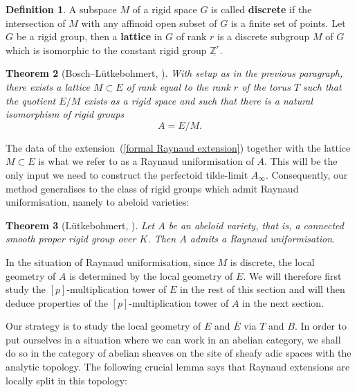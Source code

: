 \documentclass[10pt,oneside]{amsart}
\newtheorem{theorem}{Theorem}[section]
\theoremstyle{definition}
\newtheorem{definition}[theorem]{Definition}
\begin{document}
	\begin{definition}
		A subspace $M$ of a rigid space $G$ is called \textbf{discrete} if the intersection of $M$ with any affinoid open subset of $G$ is a finite set of points.
		Let $G$ be a rigid group, then a \textbf{lattice} in $G$ of rank $r$ is a discrete subgroup $M$ of $G$ which is isomorphic to the constant rigid group $\underline{\mathbb Z^r}$. 
	\end{definition}
	
	\begin{theorem}[Bosch--L\"utkebohmert, {\cite[Theorem~1.2]{BL}}]\label{Raynaud uniformisation}
	    With setup as in the previous paragraph, there exists a lattice $M \subset E$ of rank equal to the rank $r$ of the torus $T$ such that the quotient $E/M$ exists as a rigid space and such that there is a natural isomorphism of rigid groups
		\[A=E/M.\]
	\end{theorem}
	
	The data of the extension~(\ref{formal Raynaud extension}) together with the lattice $M\subset E$ is what we refer to as a Raynaud uniformisation of $A$. This will be the only input we need to construct the perfectoid tilde-limit $A_\infty$. Consequently, our method generalises to the class of rigid groups which admit Raynaud uniformisation, namely to abeloid varieties:
	\begin{theorem}[L\"utkebohmert, {\cite[Theorem 7.6.4]{Lut}}]\label{Raynaud uniformisation for abeloids}
		Let $A$ be an abeloid variety, that is, a connected smooth proper rigid group over $K$. Then $A$ admits a Raynaud uniformisation.
	\end{theorem}
	
	In the situation of Raynaud uniformisation, since $M$ is discrete, the local geometry of $A$ is determined by the local geometry of $E$. We will therefore first study the $[p]$-multiplication tower of $E$ in the rest of this section and will then deduce properties of the $[p]$-multiplication tower of $A$ in the next section.

	 Our strategy is to study the local geometry of $E$ and $\overline{E}$ via $T$ and $B$. In order to put ourselves in a situation where we can work in an abelian category, we shall do so in the category of abelian sheaves on the site of sheafy adic spaces with the analytic topology. The following crucial lemma says that Raynaud extensions are locally split in this topology:
\end{document}
